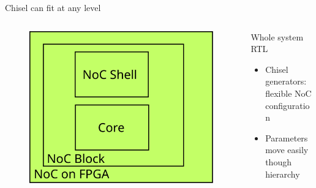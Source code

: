\documentclass{beamer}
\begin{document}
\begin{frame}{Chisel can fit at any level}
\begin{columns}
  \begin{column}{0.4\textwidth}
    \begin{figure}
      \centering
      \includegraphics[width=\textwidth]{figs/chisel_4.svg}
    \end{figure}
  \end{column}
  \begin{column}{0.6\textwidth}
    Whole system RTL
    \begin{itemize}
      \item Chisel generators: flexible NoC configuration
      \item Parameters move easily though hierarchy
    \end{itemize}
  \end{column}
\end{columns}
\end{frame}
\end{document}
